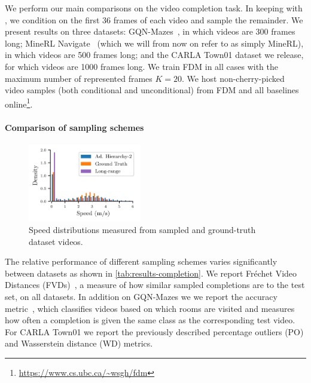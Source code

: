 We perform our main comparisons on the video completion task. In keeping with \citet{saxena2021clockwork}, we condition on the first 36 frames of each video and sample the remainder. We present results on three datasets: GQN-Mazes~\citep{eslami2018neural}, in which videos are 300 frames long; MineRL Navigate~\citep{guss2019minerl,saxena2021clockwork} (which we will from now on refer to as simply MineRL), in which videos are 500 frames long; and the CARLA Town01 dataset we release, for which videos are 1000 frames long. We train FDM in all cases with the maximum number of represented frames $K=20$. We host non-cherry-picked video samples (both conditional and unconditional) from FDM and all baselines online\footnote{\url{https://www.cs.ubc.ca/~wsgh/fdm}}.



\paragraph{Comparison of sampling schemes}
\begin{figure}
  \vspace{-.3cm}
  \begin{center}
    \includegraphics[width=0.44\textwidth]{figs/fdm/hist_new.pdf}
  \end{center}
  \caption{Speed distributions measured from sampled and ground-truth dataset videos.}
  \label{fig:hist}
\end{figure}
The relative performance of different sampling schemes varies significantly between datasets as shown in \cref{tab:results-completion}. We report Fréchet Video Distances (FVDs)~\cite{unterthiner2018towards}, a measure of how similar sampled completions are to the test set, on all datasets. In addition on GQN-Mazes we we report the accuracy metric~\cite{saxena2021clockwork}, which classifies videos based on which rooms are visited and measures how often a completion is given the same class as the corresponding test video. For CARLA Town01 we report the previously described percentage outliers (PO) and Wasserstein distance (WD) metrics. 

